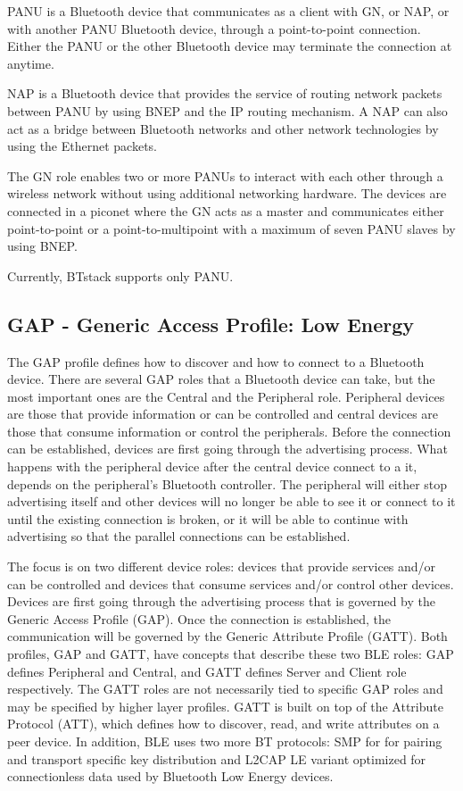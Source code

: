PANU is a Bluetooth device that communicates as a client with GN, or NAP, or with another PANU Bluetooth device, through a point-to-point connection. Either the PANU or the other Bluetooth device may terminate the connection at anytime.

NAP is a Bluetooth device that provides the service of routing network packets between PANU by using BNEP and the IP routing mechanism. A NAP can also act as a bridge between Bluetooth networks and other network technologies by using the Ethernet packets.

The GN role enables two or more PANUs to interact with each other through a wireless network without using additional networking hardware. The devices are connected in a piconet where the GN acts as a master and communicates either point-to-point or a point-to-multipoint with a maximum of seven PANU slaves by using BNEP.

Currently, BTstack supports only PANU.

\subsection{GAP - Generic Access Profile: Low Energy}
The GAP profile defines how to discover and how to connect to a Bluetooth device. There are several GAP roles that a Bluetooth device can take, but the most important ones are the Central and the Peripheral role. Peripheral devices are those that provide information or can be controlled and central devices are those that consume information or control the peripherals. Before the connection can be established, devices are first going through the advertising process. What happens with the peripheral device after the central device connect to a it, depends on the peripheral's Bluetooth controller. The peripheral will either stop advertising itself and other devices will no longer be able to see it or connect to it until the existing connection is broken, or it will be able to continue with advertising so that the parallel connections can be established.

The focus is on two different device roles:  devices that provide services and/or can be controlled and devices that consume services and/or control other devices. Devices are first going through the advertising process that is governed by the Generic Access Profile (GAP). Once the connection is established, the communication will be governed by the Generic Attribute Profile (GATT). Both profiles, GAP and GATT, have concepts that describe these two BLE roles:  GAP defines Peripheral and Central, and GATT defines Server and Client role respectively. The GATT roles are not necessarily tied to specific GAP roles and may be specified by higher layer profiles. GATT is built on top of the Attribute Protocol (ATT), which defines how to discover, read, and write attributes on a peer device. In addition, BLE uses two more BT protocols: SMP for for pairing and transport specific key distribution and L2CAP LE variant optimized for connectionless data used by Bluetooth Low Energy devices. 


